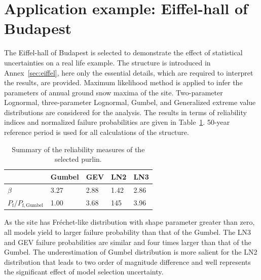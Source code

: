 


\section{Application example: Eiffel-hall of Budapest}

The Eiffel-hall of Budapest is selected to demonstrate the effect of statistical uncertainties on a real life example. The structure is introduced in Annex~\ref{sec:eiffel}, here only the essential details, which are required to interpret the results, are provided. Maximum likelihood method is applied to infer the parameters of annual ground snow maxima of the site. Two-parameter Lognormal, three-parameter Lognormal, Gumbel, and Generalized extreme value distributions are considered for the analysis. The results in terms of reliability indices and normalized failure probabilities are given in Table~\ref{tab:eiffel_statunc}. 50-year reference period is used for all calculations of the structure.

\begin{table}[htbp!]
\caption{Summary of the reliability measures of the selected purlin.}
\centering
\label{tab:eiffel_statunc}
\small
    \begin{tabular}{lllll}
    \toprule
      & Gumbel & GEV & LN2 & LN3 \\
    \midrule
    \rowcolor{lightgrey} $\beta$ & 3.27  & 2.88 & 1.42 & 2.86 \\
    $P_\mathrm{f}/P_\mathrm{f,Gumbel}$ & 1.00  & 3.68 & 145 & 3.96 \\
    \bottomrule
    \end{tabular}
\end{table}

As the site has Fréchet-like distribution with shape parameter greater than zero, all models yield to larger failure probability than that of the Gumbel. The LN3 and GEV failure probabilities are similar and four times larger than that of the Gumbel. The underestimation of Gumbel distribution is more salient for the LN2 distribution that leads to two order of magnitude difference and well represents the significant effect of model selection uncertainty.

